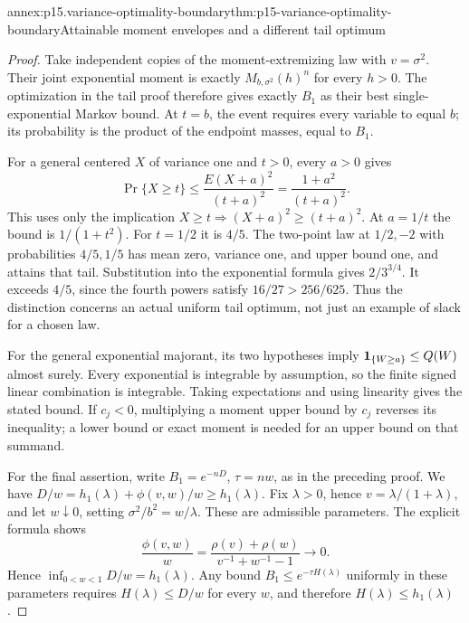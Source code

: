 \begin{annexitem}{annex:p15.variance-optimality-boundary}{thm:p15-variance-optimality-boundary}{Attainable moment envelopes and a different tail optimum}
\begin{proof}
Take independent copies of the moment-extremizing law with \(v=\sigma^2\).
Their joint exponential moment is exactly \(M_{b,\sigma^2}(h)^n\)
for every \(h>0\). The optimization in the tail proof therefore gives
exactly \(B_1\) as their best single-exponential Markov bound.
At \(t=b\), the event requires every variable to equal \(b\); its
probability is the product of the endpoint masses, equal to \(B_1\).

For a general centered \(X\) of variance one and \(t>0\), every
\(a>0\) gives
\[
 \Pr\{X\geq t\}\leq\frac{E(X+a)^2}{(t+a)^2}
                         =\frac{1+a^2}{(t+a)^2}.
\]
This uses only the implication \(X\geq t\Rightarrow(X+a)^2\geq(t+a)^2\).
At \(a=1/t\) the bound is \(1/(1+t^2)\). For \(t=1/2\) it is \(4/5\).
The two-point law at \(1/2,-2\) with probabilities \(4/5,1/5\)
has mean zero, variance one, and upper bound one, and attains that tail.
Substitution into the exponential formula gives \(2/3^{3/4}\).
It exceeds \(4/5\), since the fourth powers satisfy
\(16/27>256/625\). Thus the distinction concerns an actual uniform
tail optimum, not just an example of slack for a chosen law.

For the general exponential majorant, its two hypotheses imply
\({\bf1}_{\{W\geq a\}}\leq Q(W)\) almost surely.
Every exponential is integrable by assumption, so the finite signed
linear combination is integrable. Taking expectations and using
linearity gives the stated bound. If \(c_j<0\), multiplying a moment
upper bound by \(c_j\) reverses its inequality; a lower bound or exact
moment is needed for an upper bound on that summand.

For the final assertion, write \(B_1=e^{-nD}\),
\(\tau=nw\), as in the preceding proof. We have
\(D/w=h_1(\lambda)+\phi(v,w)/w\geq h_1(\lambda)\).
Fix \(\lambda>0\), hence \(v=\lambda/(1+\lambda)\), and let
\(w\downarrow0\), setting \(\sigma^2/b^2=w/\lambda\).
These are admissible parameters. The explicit formula shows
\[
 \frac{\phi(v,w)}w
 =\frac{\rho(v)+\rho(w)}{v^{-1}+w^{-1}-1}\longrightarrow0.
\]
Hence \(\inf_{0<w<1}D/w=h_1(\lambda)\).
Any bound \(B_1\leq e^{-\tau H(\lambda)}\) uniformly in these
parameters requires \(H(\lambda)\leq D/w\) for every \(w\), and
therefore \(H(\lambda)\leq h_1(\lambda)\).
\end{proof}
\end{annexitem}

